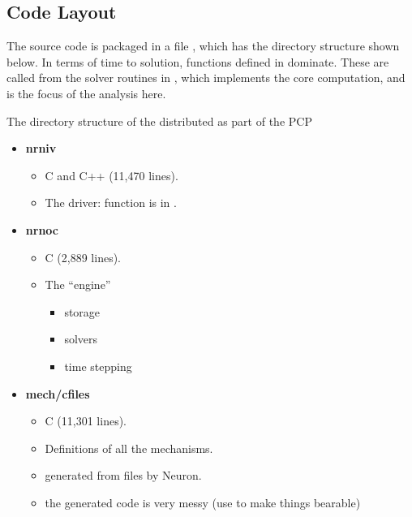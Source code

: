 \subsection{Code Layout}
The source code is packaged in a file , which has the directory structure shown below.
In terms of time to solution, functions defined in  dominate. These are called from the solver routines in , which implements the core computation, and is the focus of the analysis here.

\begin{infobox}{The directory structure of the \neuron distributed as part of the PCP}
\begin{itemize}[leftmargin=*]
    \item \textbf{nrniv}
    \begin{itemize}
        \item C and C++ (11,470 lines).
        \item The \neuron driver:  function is in .
    \end{itemize}

    \item \textbf{nrnoc}
    \begin{itemize}
        \item C (2,889 lines).
        \item The \neuron ``engine''
        \begin{itemize}
            \item storage
            \item solvers
            \item time stepping
        \end{itemize}
    \end{itemize}

    \item \textbf{mech/cfiles}
    \begin{itemize}
        \item C (11,301 lines).
        \item Definitions of all the mechanisms.
        \item generated from \hoc files by Neuron.
        \item the generated code is very messy (use  to make things bearable)
    \end{itemize}


\end{itemize}
\end{infobox}
